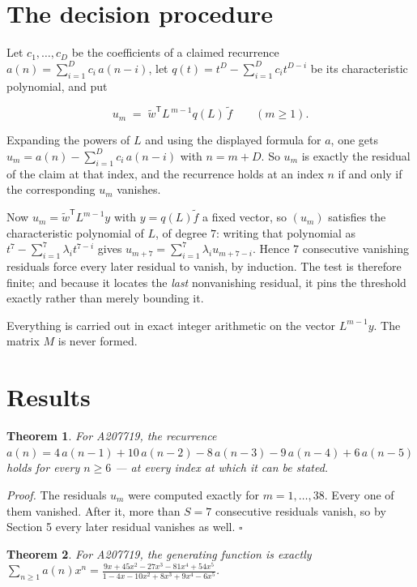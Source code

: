 \documentclass[11pt]{article}
\newtheorem{theorem}{Theorem}
\theoremstyle{definition}
\begin{document}
\section{The decision procedure}

Let $c_1,\dots,c_D$ be the coefficients of a claimed recurrence $a(n) = \sum_{i=1}^{D} c_i\,a(n-i)$, let $q(t) = t^{D} - \sum_{i=1}^{D} c_i t^{D-i}$ be its characteristic polynomial, and put

\[u_m \;=\; \tilde w^{\mathsf T} L^{\,m-1} q(L)\,\tilde f \qquad (m \ge 1).\]

Expanding the powers of $L$ and using the displayed formula for $a$, one gets $u_m = a(n) - \sum_{i=1}^{D} c_i\,a(n-i)$ with $n = m + D$. So $u_m$ is exactly the residual of the claim at that index, and the recurrence holds at an index $n$ if and only if the corresponding $u_m$ vanishes.

Now $u_m = \tilde w^{\mathsf T} L^{m-1} y$ with $y = q(L)\tilde f$ a fixed vector, so $(u_m)$ satisfies the characteristic polynomial of $L$, of degree $7$: writing that polynomial as $t^{7} - \sum_{i=1}^{7} \lambda_i t^{7-i}$ gives $u_{m+7} = \sum_{i=1}^{7} \lambda_i u_{m+7-i}$. Hence $7$ consecutive vanishing residuals force every later residual to vanish, by induction. The test is therefore finite; and because it locates the {\itshape last} nonvanishing residual, it pins the threshold exactly rather than merely bounding it.

Everything is carried out in exact integer arithmetic on the vector $L^{m-1}y$. The matrix $M$ is never formed.

\section{Results}

\begin{theorem} For A207719, the recurrence $a(n) = 4\,a(n-1) + 10\,a(n-2) - 8\,a(n-3) - 9\,a(n-4) + 6\,a(n-5)$ holds for every $n \ge 6$ --- at every index at which it can be stated.\end{theorem}

{\itshape Proof.} The residuals $u_m$ were computed exactly for $m = 1,\dots,38$. Every one of them vanished. After it, more than $S = 7$ consecutive residuals vanish, so by Section 5 every later residual vanishes as well. $\square$

\begin{theorem} For A207719, the generating function is exactly $\sum_{n\ge 1} a(n)x^n = \frac{9x + 45x^{2} - 27x^{3} - 81x^{4} + 54x^{5}}{1 - 4x - 10x^{2} + 8x^{3} + 9x^{4} - 6x^{5}}$.\end{theorem}
\end{document}
